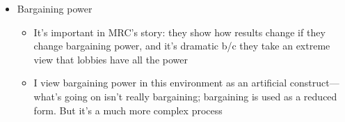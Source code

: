 \begin{itemize}
\begin{itemize}
		\end{itemize}
	\item Bargaining power
		\begin{itemize}
			\item It's important in MRC's story: they show how results change if they change bargaining power, and it's dramatic b/c they take an extreme view that lobbies have all the power
			\item I view bargaining power in this environment as an artificial construct---what's going on isn't really bargaining; bargaining is used as a reduced form. But it's a much more complex process
		\end{itemize}
\end{itemize}

		
%